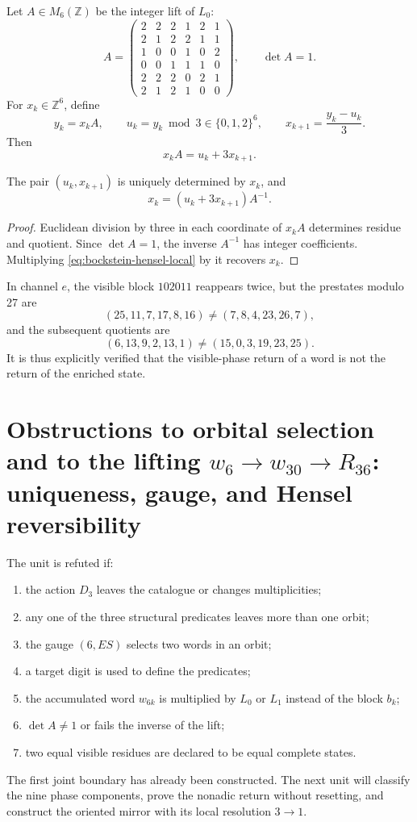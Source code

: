Let \(A\in M_6(\mathbb Z)\) be the integer lift of \(L_0\):
\[
 A=
\begin{pmatrix}
2&2&2&1&2&1\\
2&1&2&2&1&1\\
1&0&0&1&0&2\\
0&0&1&1&1&0\\
2&2&2&0&2&1\\
2&1&2&1&0&0
\end{pmatrix},
\qquad \det A=1.
\]
For \(x_k\in\mathbb Z^6\), define
\[
 y_k=x_kA,
 \qquad
 u_k=y_k\bmod3\in\{0,1,2\}^6,
 \qquad
 x_{k+1}=\frac{y_k-u_k}{3}.
\]
Then
\begin{equation}
 x_kA=u_k+3x_{k+1}.
\label{eq:bockstein-hensel-local}
\end{equation}

\begin{theorem}
\label{thm:reversibilidad-bockstein-hensel}
The pair \((u_k,x_{k+1})\) is uniquely determined by \(x_k\), and
\[
 x_k=(u_k+3x_{k+1})A^{-1}.
\]
\end{theorem}

\begin{proof}
Euclidean division by three in each coordinate of \(x_kA\) determines
residue and quotient. Since \(\det A=1\), the inverse \(A^{-1}\) has
integer coefficients. Multiplying \cref{eq:bockstein-hensel-local} by it
recovers \(x_k\).
\end{proof}

In channel \(e\), the visible block \(102011\) reappears twice, but
the prestates modulo 27 are
\[
 (25,11,7,17,8,16)
 \neq
 (7,8,4,23,26,7),
\]
and the subsequent quotients are
\[
 (6,13,9,2,13,1)
 \neq
 (15,0,3,19,23,25).
\]
It is thus explicitly verified that the visible-phase return of a word is not the return of the enriched state.

\section{Obstructions to orbital selection and to the lifting \(w_6\to w_{30}\to R_{36}\): uniqueness, gauge, and Hensel reversibility}

\begin{criterion}
The unit is refuted if:
\begin{enumerate}
 \item the action \(D_3\) leaves the catalogue or changes multiplicities;
 \item any one of the three structural predicates leaves more than one orbit;
 \item the gauge \((6,ES)\) selects two words in an orbit;
 \item a target digit is used to define the predicates;
 \item the accumulated word \(w_{6k}\) is multiplied by \(L_0\) or
       \(L_1\) instead of the block \(b_k\);
 \item \(\det A\neq1\) or fails the inverse of the lift;
 \item two equal visible residues are declared to be equal complete states.
\end{enumerate}
\end{criterion}

The first joint boundary has already been constructed. The next unit
will classify the nine phase components, prove the nonadic return
without resetting, and construct the oriented mirror with its local resolution
\(3\to1\).

